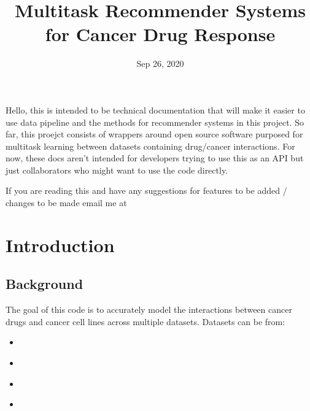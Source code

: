 \documentclass[letterpaper,10pt,english,openany,oneside]{sphinxmanual}
\title{Multitask Recommender Systems for Cancer Drug Response}
\date{Sep 26, 2020}
\author{}
\begin{document}
\pagestyle{empty}
\sphinxmaketitle
\pagestyle{plain}
\sphinxtableofcontents
\pagestyle{normal}
\label{\detokenize{index::doc}}


Hello, this is intended to be technical documentation that will make it easier to use data pipeline and the methods for recommender systems
in this project. So far, this proejct consists of wrappers around open source software purposed for multitask learning between datasets containing drug/cancer interactions. For now, these docs aren’t intended for developers trying to use this as an API but just collaborators who might want to use the code directly.

If you are reading this and have any suggestions for features to be added / changes to be made email me at 


\chapter{Introduction}
\label{\detokenize{intro:introduction}}\label{\detokenize{intro::doc}}

\section{Background}
\label{\detokenize{intro:background}}
The goal of this code is to accurately model the interactions between cancer drugs and cancer cell lines across multiple datasets. Datasets can be from:
\begin{itemize}
\item {} 
%
\begin{footnote}[1]\sphinxAtStartFootnote
{}
%
\end{footnote} 

\item {} 
%
\begin{footnote}[2]\sphinxAtStartFootnote
{}
%
\end{footnote} 

\item {} 
%
\begin{footnote}[3]\sphinxAtStartFootnote
{}
%
\end{footnote}

\item {} 
%
\begin{footnote}[4]\sphinxAtStartFootnote
{}
%
\end{footnote}

\end{itemize}
\end{document}
